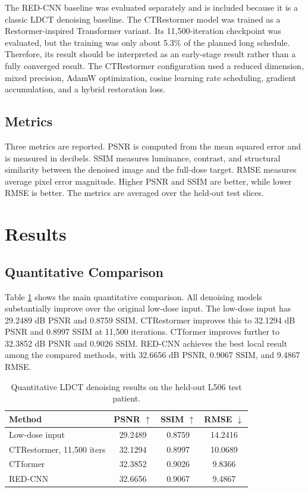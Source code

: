 \documentclass[journal]{IEEEtran}
\begin{document}
The RED-CNN baseline was evaluated separately and is included because it is a classic LDCT denoising baseline. The CTRestormer model was trained as a Restormer-inspired Transformer variant. Its 11,500-iteration checkpoint was evaluated, but the training was only about 5.3\% of the planned long schedule. Therefore, its result should be interpreted as an early-stage result rather than a fully converged result. The CTRestormer configuration used a reduced dimension, mixed precision, AdamW optimization, cosine learning rate scheduling, gradient accumulation, and a hybrid restoration loss.

\subsection{Metrics}
Three metrics are reported. PSNR is computed from the mean squared error and is measured in decibels. SSIM measures luminance, contrast, and structural similarity between the denoised image and the full-dose target. RMSE measures average pixel error magnitude. Higher PSNR and SSIM are better, while lower RMSE is better. The metrics are averaged over the held-out test slices.

\section{Results}
\subsection{Quantitative Comparison}
Table \ref{tab:metrics} shows the main quantitative comparison. All denoising models substantially improve over the original low-dose input. The low-dose input has 29.2489 dB PSNR and 0.8759 SSIM. CTRestormer improves this to 32.1294 dB PSNR and 0.8997 SSIM at 11,500 iterations. CTformer improves further to 32.3852 dB PSNR and 0.9026 SSIM. RED-CNN achieves the best local result among the compared methods, with 32.6656 dB PSNR, 0.9067 SSIM, and 9.4867 RMSE.

\begin{table}[t]
\centering
\caption{Quantitative LDCT denoising results on the held-out L506 test patient.}
\label{tab:metrics}
\begin{tabular}{lccc}
\toprule
Method & PSNR $\uparrow$ & SSIM $\uparrow$ & RMSE $\downarrow$ \\
\midrule
Low-dose input & 29.2489 & 0.8759 & 14.2416 \\
CTRestormer, 11,500 iters & 32.1294 & 0.8997 & 10.0689 \\
CTformer & 32.3852 & 0.9026 & 9.8366 \\
RED-CNN & 32.6656 & 0.9067 & 9.4867 \\
\bottomrule
\end{tabular}
\end{table}
\end{document}
